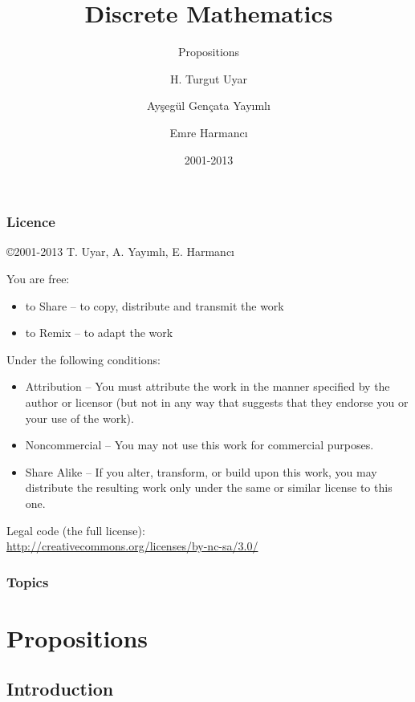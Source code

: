 \documentclass[dvipsnames]{beamer}
\title{Discrete Mathematics}
\subtitle{Propositions}
\author{H. Turgut Uyar \and Ayşegül Gençata Yayımlı \and Emre Harmancı}
\date{2001-2013}
\begin{document}
\begin{frame}
  \titlepage
\end{frame}

\begin{frame}
  \frametitle{Licence}

  \hfill
  \copyright 2001-2013 T. Uyar, A. Yayımlı, E. Harmancı

  \vfill
  \begin{tiny}
    You are free:
    \begin{itemize}
      \item to Share -- to copy, distribute and transmit the work
      \item to Remix -- to adapt the work
    \end{itemize}

    Under the following conditions:
    \begin{itemize}
      \item Attribution -- You must attribute the work in the manner specified by
        the author or licensor (but not in any way that suggests that they
        endorse you or your use of the work).

      \item Noncommercial -- You may not use this work for commercial purposes.

      \item Share Alike -- If you alter, transform, or build upon this work, you
        may distribute the resulting work only under the same or similar license
        to this one.
    \end{itemize}
  \end{tiny}

  \vfill
  Legal code (the full license):\\
  \url{http://creativecommons.org/licenses/by-nc-sa/3.0/}
\end{frame}

\begin{frame}
  \frametitle{Topics}
  \tableofcontents
\end{frame}

\section{Propositions}

\subsection{Introduction}
\end{document}
